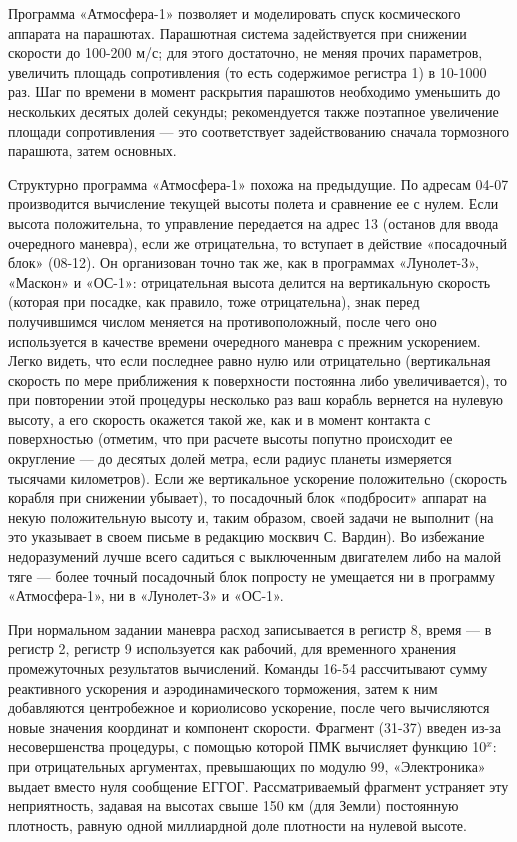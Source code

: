 \documentclass[11pt,a4paper,oneside]{article}
\begin{document}
Программа «Атмосфера-1» позволяет и моделировать спуск космического аппарата на парашютах. Парашютная система задействуется при снижении скорости до 100-200 м/с; для этого достаточно, не меняя прочих параметров, увеличить площадь сопротивления (то есть содержимое регистра 1) в 10-1000 раз. Шаг по времени в момент раскрытия парашютов необходимо уменьшить до нескольких десятых долей секунды; рекомендуется также поэтапное увеличение площади сопротивления — это соответствует задействованию сначала тормозного парашюта, затем основных.

Структурно программа «Атмосфера-1» похожа на предыдущие. По адресам 04-07 производится вычисление текущей высоты полета и сравнение ее с нулем. Если высота положительна, то управление передается на адрес 13 (останов для ввода очередного маневра), если же отрицательна, то вступает в действие «посадочный блок» (08-12). Он организован точно так же, как в программах «Лунолет-3», «Маскон» и «ОС-1»: отрицательная высота делится на вертикальную скорость (которая при посадке, как правило, тоже отрицательна), знак перед получившимся числом меняется на противоположный, после чего оно используется в качестве времени очередного маневра с прежним ускорением. Легко видеть, что если последнее равно нулю или отрицательно (вертикальная скорость по мере приближения к поверхности постоянна либо увеличивается), то при повторении этой процедуры несколько раз ваш корабль вернется на нулевую высоту, а его скорость окажется такой же, как и в момент контакта с поверхностью (отметим, что при расчете высоты попутно происходит ее округление — до десятых долей метра, если радиус планеты измеряется тысячами километров). Если же вертикальное ускорение положительно (скорость корабля при снижении убывает), то посадочный блок «подбросит» аппарат на некую положительную высоту и, таким образом, своей задачи не выполнит (на это указывает в своем письме в редакцию москвич С. Вардин). Во избежание недоразумений лучше всего садиться с выключенным двигателем либо на малой тяге — более точный посадочный блок попросту не умещается ни в программу «Атмосфера-1», ни в «Лунолет-3» и «ОС-1».

При нормальном задании маневра расход записывается в регистр 8, время — в регистр 2, регистр 9 используется как рабочий, для временного хранения промежуточных результатов вычислений. Команды 16-54 рассчитывают сумму реактивного ускорения и аэродинамического торможения, затем к ним добавляются центробежное и кориолисово ускорение, после чего вычисляются новые значения координат и компонент скорости. Фрагмент (31-37) введен из-за несовершенства процедуры, с помощью которой ПМК вычисляет функцию 10$^{x}$: при отрицательных аргументах, превышающих по модулю 99, «Электроника» выдает вместо нуля сообщение ЕГГОГ. Рассматриваемый фрагмент устраняет эту неприятность, задавая на высотах свыше 150 км (для Земли) постоянную плотность, равную одной миллиардной доле плотности на нулевой высоте.
\end{document}
